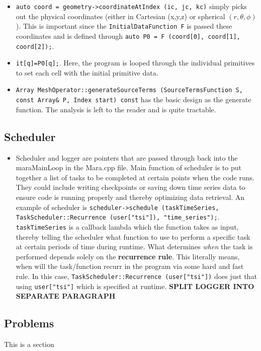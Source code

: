 \documentclass{article}
\begin{document}
\begin{itemize}
	\item \texttt{auto coord = geometry->coordinateAtIndex (ic, jc, kc)} simply picks out the physical coordinates (either in Cartesian (x,y,z) or spherical $(r,\theta,\phi)$). This is important since the \texttt{InitialDataFunction F} is passed these coordinates and is defined through \texttt{auto P0 = F (coord[0], coord[1], coord[2]);}.
	
	\item \texttt{it[q]=P0[q];}. Here, the program is looped through the individual primitives to set each cell with the initial primitive data.
	
	\item \texttt{Array MeshOperator::generateSourceTerms (SourceTermsFunction S, const Array\& P, Index start) const} has the basic design as the generate function. The analysis is left to the reader and is quite tractable.
	
\end{itemize}

\subsection{Scheduler}
\begin{itemize}
	\item Scheduler and logger are pointers that are passed through back into the maraMainLoop in the Mara.cpp file. Main function of scheduler is to put together a list of tasks to be completed at certain points when the code runs. They could include writing checkpoints or saving down time series data to ensure code is running properly and thereby optimizing data retrieval. An example of scheduler is \texttt{scheduler->schedule (taskTimeSeries, TaskScheduler::Recurrence (user["tsi"]), "time\_series");}. \texttt{taskTimeSeries} is a callback lambda which the function takes as input, thereby telling the scheduler what function to use to perform a specific task at certain periods of time during runtime. What determines \emph{when} the task is performed depends solely on the \textbf{recurrence rule}. This literally means, when will the task/function recurr in the program via some hard and fast rule. In this case, \texttt{TaskScheduler::Recurrence (user["tsi"])} does just that using \texttt{user["tsi"]} which is specified at runtime. \textbf{SPLIT LOGGER INTO SEPARATE PARAGRAPH}
\end{itemize}


\subsection{Problems}
This is a section 
\end{document}
